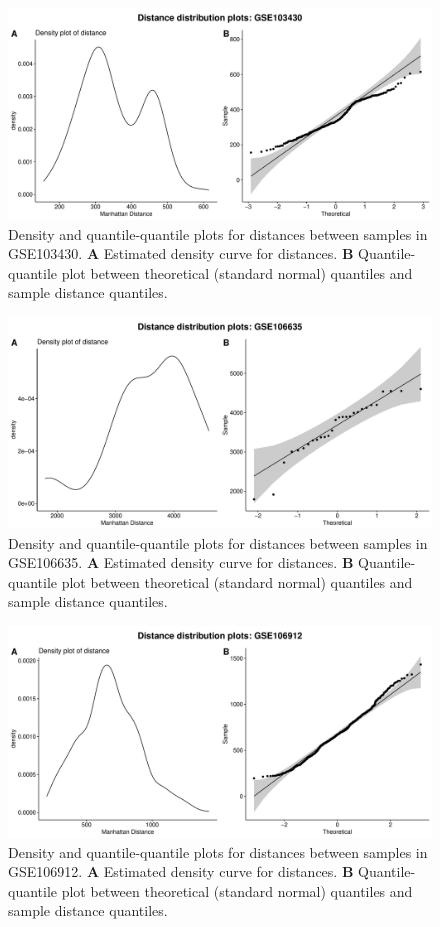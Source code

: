 \documentclass[10pt,letterpaper]{article}\usepackage[]{graphicx}\usepackage[]{color}
\begin{document}
\begin{figure}[H]
	\includegraphics[width=\textwidth]{manhattan-distance_hist_GSE103430.pdf}
	\caption{Density and quantile-quantile plots for distances between samples in GSE103430. \textbf{A} Estimated density curve for distances. \textbf{B} Quantile-quantile plot between theoretical (standard normal) quantiles and sample distance quantiles.}
\end{figure}

\begin{figure}[H]
	\includegraphics[width=\textwidth]{manhattan-distance_hist_GSE106635.pdf}
	\caption{Density and quantile-quantile plots for distances between samples in GSE106635. \textbf{A} Estimated density curve for distances. \textbf{B} Quantile-quantile plot between theoretical (standard normal) quantiles and sample distance quantiles.}
\end{figure}

\begin{figure}[H]
	\includegraphics[width=\textwidth]{manhattan-distance_hist_GSE106912.pdf}
	\caption{Density and quantile-quantile plots for distances between samples in GSE106912. \textbf{A} Estimated density curve for distances. \textbf{B} Quantile-quantile plot between theoretical (standard normal) quantiles and sample distance quantiles.}
\end{figure}
\end{document}
